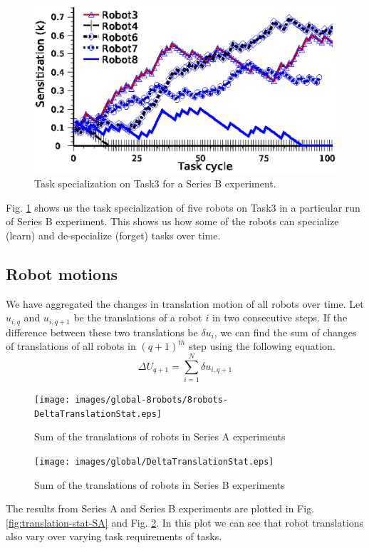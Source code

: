 \documentclass[preprint,12pt]{elsarticle}
\begin{document}
\begin{figure}
\centering
\includegraphics[width=\textwidth, angle=0]{images/TaskSpecialization-task3-10may-1.eps}
\caption{Task specialization on Task3 for a Series B experiment.}
\label{fig:k-single-task-SB} 
\end{figure}
Fig. \ref{fig:k-single-task-SB} shows us the task specialization of five robots on Task3 in a particular run of Series B experiment. This shows us how some of the robots can specialize (learn) and de-specialize (forget) tasks over time.
\subsection*{Robot motions}
We have aggregated the changes in translation motion of all robots over time. Let $u_{i,q}$ and $u_{i,q+1}$ be the translations of a robot $i$ in two consecutive steps. If the difference between these two translations be $\delta u_{i}$, we can find the sum of changes of translations of all robots in $(q+1)^{th}$ step using the following equation.
\begin{equation}
\Delta U_{q+1} = \sum_{i=1}^{N} \delta u_{i, q+1} 
\label{eqn:Delta-Tr}
\end{equation}
\begin{figure}
\centering
\texttt{[image: images/global-8robots/8robots-DeltaTranslationStat.eps]}
\caption{\small Sum of the translations of robots in Series A experiments}
\label{fig:translation-stat-SA} %
\centering
\texttt{[image: images/global/DeltaTranslationStat.eps]}
\caption{\small Sum of the translations of robots in Series B experiments}
\label{fig:translation-stat-SB} %
\end{figure}
The results from Series A and Series B experiments are plotted in Fig. \ref{fig:translation-stat-SA} and Fig. \ref{fig:translation-stat-SB}. In this plot we can see that robot translations also vary over varying task requirements of tasks.
\end{document}
